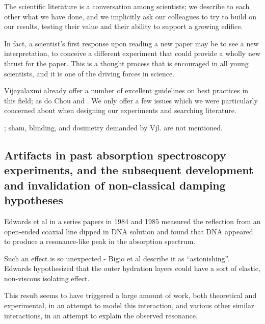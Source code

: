 \documentclass[paper.tex]{subfiles}
\begin{document}
\begin{fquote}
	The scientific literature is a conversation among scientists; we describe to each other what we have done, and we implicitly ask our colleagues to try to build on our results, testing their value and their ability to support a growing edifice.
	
	In fact, a scientist's first response upon reading a new paper may be to see a new interpretation, to conceive a different experiment that could provide a wholly new thrust for the paper. This is a thought process that is encouraged in all young scientists, and it is one of the driving forces in science.
\end{fquote}



\begin{multicols}{1}

Vijayalaxmi \cite{Biological2016} \cite{Comprehensive2018} \cite{Funding2019} already offer a number of excellent guidelines on best practices in this field; as do Chou \cite{chou1996radio} and \cite{Effects2016} . We only offer a few issues which we were particularly concerned about when designing our experiments and searching literature. 

; sham, blinding, and dosimetry demanded by Vjl. are not mentioned.


\subsection{Artifacts in past absorption spectroscopy experiments, and the subsequent development and invalidation of non-classical damping hypotheses}

Edwards et al in a series papers in 1984 and 1985 measured the reflection from an open-ended coaxial line dipped in DNA solution and found that DNA appeared to produce a resonance-like peak in the absorption spectrum.

Such an effect is so unexpected - Bigio et al describe it as “astonishing”. \\

Edwards hypothesized that the outer hydration layers could have a sort of elastic, non-viscous isolating effect.

This result seems to have triggered a large amount of work, both theoretical and experimental\cite{Structure1989}, in an attempt to model this interaction, and various other similar interactions, in an attempt to explain the observed resonance.


\end{multicols}
\end{document}
